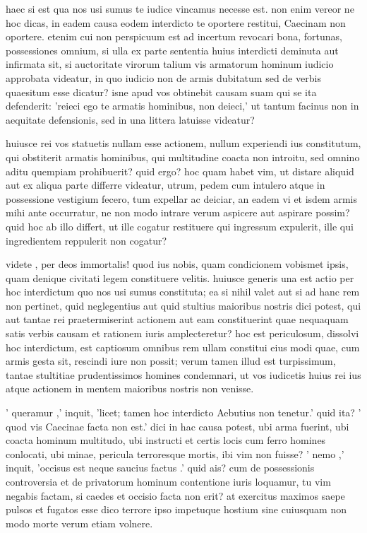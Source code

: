  haec si est qua nos usi sumus te iudice vincamus necesse est. non enim vereor ne hoc dicas, in eadem causa eodem interdicto te oportere restitui, Caecinam non oportere. etenim cui non perspicuum est ad incertum revocari bona, fortunas, possessiones omnium, si ulla ex parte sententia huius interdicti deminuta aut infirmata sit, si auctoritate virorum talium vis armatorum hominum iudicio approbata videatur, in quo iudicio non de armis dubitatum sed de verbis quaesitum esse dicatur? isne apud vos obtinebit causam suam qui se ita defenderit: 'reieci ego te armatis hominibus, non deieci,' ut tantum facinus non in aequitate defensionis, sed in una littera latuisse videatur?

 huiusce rei vos statuetis nullam esse actionem, nullum experiendi ius constitutum, qui obstiterit armatis hominibus, qui multitudine coacta non introitu, sed omnino aditu quempiam prohibuerit? quid ergo? hoc quam habet vim, ut distare aliquid aut ex aliqua parte differre videatur, utrum, pedem cum intulero atque in possessione vestigium fecero, tum expellar ac deiciar, an eadem vi et isdem armis mihi ante occurratur, ne non modo intrare verum aspicere aut aspirare possim? quid hoc ab illo differt, ut ille cogatur restituere qui ingressum expulerit, ille qui ingredientem reppulerit non cogatur?

 videte , per deos immortalis! quod ius nobis, quam condicionem vobismet ipsis, quam denique civitati legem constituere velitis. huiusce generis una est actio per hoc interdictum quo nos usi sumus constituta; ea si nihil valet aut si ad hanc rem non pertinet, quid neglegentius aut quid stultius maioribus nostris dici potest, qui aut tantae rei praetermiserint actionem aut eam constituerint quae nequaquam satis verbis causam et rationem iuris amplecteretur? hoc est periculosum, dissolvi hoc interdictum, est captiosum omnibus rem ullam constitui eius modi quae, cum armis gesta sit, rescindi iure non possit; verum tamen illud est turpissimum, tantae stultitiae prudentissimos homines condemnari, ut vos iudicetis huius rei ius atque actionem in mentem maioribus nostris non venisse.

 ' queramur ,' inquit, 'licet; tamen hoc interdicto Aebutius non tenetur.' quid ita? ' quod vis Caecinae facta non est.' dici in hac causa potest, ubi arma fuerint, ubi coacta hominum multitudo, ubi instructi et certis locis cum ferro homines conlocati, ubi minae, pericula terroresque mortis, ibi vim non fuisse? ' nemo ,' inquit, 'occisus est neque saucius factus .' quid ais? cum de possessionis controversia et de privatorum hominum contentione iuris loquamur, tu vim negabis factam, si caedes et occisio facta non erit? at exercitus maximos saepe pulsos et fugatos esse dico terrore ipso impetuque hostium sine cuiusquam non modo morte verum etiam volnere.


